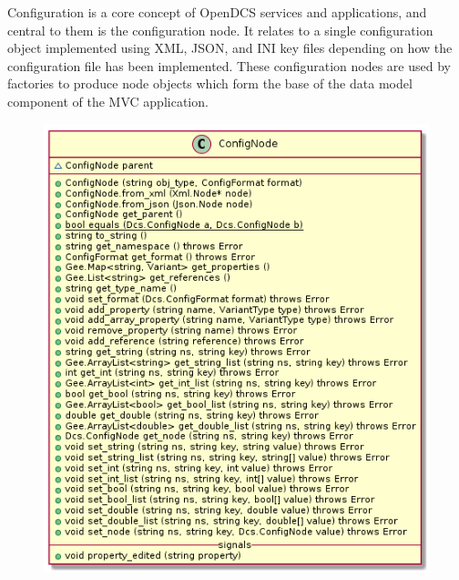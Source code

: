       \vspace*{-0.75cm}
      \begin{minipage}[t]{0.5\textwidth}
        \vspace*{0.5cm}
        Configuration is a core concept of OpenDCS services and applications,
        and central to them is the configuration node. It relates to a single
        configuration object implemented using XML, JSON, and INI key files
        depending on how the configuration file has been implemented. These
        configuration nodes are used by factories to produce node objects which
        form the base of the data model component of the MVC application.
      \end{minipage} \hfill
      \begin{minipage}[t]{0.45\textwidth}
        \begin{figure}[H]
          \includegraphics[width=\textwidth]{figures/design/class/core/config-node}
          \label{fig:dsg-classes-config-node}
        \end{figure}
      \end{minipage}

